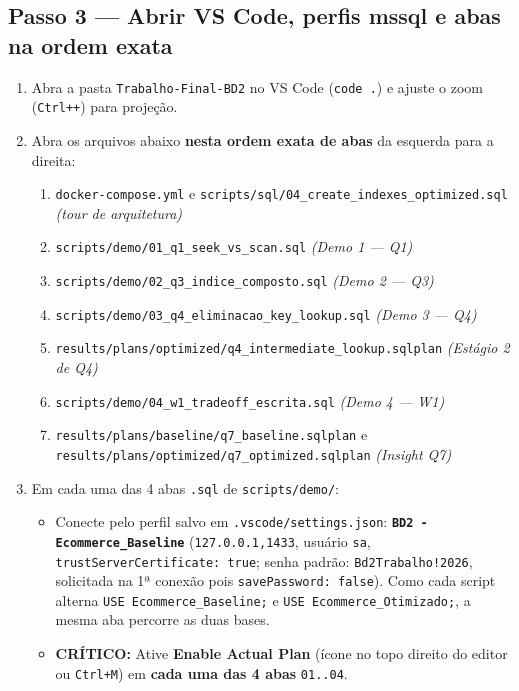 \documentclass[10pt,a4paper]{article}
\begin{document}
\subsection*{Passo 3 — Abrir VS Code, perfis mssql e abas na ordem exata}
\begin{enumerate}[leftmargin=16pt,itemsep=2pt,topsep=2pt]
  \item Abra a pasta \texttt{Trabalho-Final-BD2} no VS Code (\texttt{code .}) e ajuste o zoom (\texttt{Ctrl++}) para projeção.
  \item Abra os arquivos abaixo \textbf{nesta ordem exata de abas} da esquerda para a direita:
  \begin{enumerate}[leftmargin=14pt,itemsep=1pt,topsep=1pt]
    \item \texttt{docker-compose.yml} e \texttt{scripts/sql/04\_create\_indexes\_optimized.sql} \emph{(tour de arquitetura)}
    \item \texttt{scripts/demo/01\_q1\_seek\_vs\_scan.sql} \emph{(Demo 1 — Q1)}
    \item \texttt{scripts/demo/02\_q3\_indice\_composto.sql} \emph{(Demo 2 — Q3)}
    \item \texttt{scripts/demo/03\_q4\_eliminacao\_key\_lookup.sql} \emph{(Demo 3 — Q4)}
    \item \texttt{results/plans/optimized/q4\_intermediate\_lookup.sqlplan} \emph{(Estágio 2 de Q4)}
    \item \texttt{scripts/demo/04\_w1\_tradeoff\_escrita.sql} \emph{(Demo 4 — W1)}
    \item \texttt{results/plans/baseline/q7\_baseline.sqlplan} e \texttt{results/plans/optimized/q7\_optimized.sqlplan} \emph{(Insight Q7)}
  \end{enumerate}
  \item Em cada uma das 4 abas \texttt{.sql} de \texttt{scripts/demo/}:
  \begin{itemize}[leftmargin=14pt,itemsep=1pt,topsep=1pt]
    \item Conecte pelo perfil salvo em \texttt{.vscode/settings.json}: \textbf{\texttt{BD2 - Ecommerce\_Baseline}} (\texttt{127.0.0.1,1433}, usuário \texttt{sa}, \texttt{trustServerCertificate: true}; senha padrão: \texttt{Bd2Trabalho!2026}, solicitada na 1ª conexão pois \texttt{savePassword: false}). Como cada script alterna \texttt{USE Ecommerce\_Baseline;} e \texttt{USE Ecommerce\_Otimizado;}, a mesma aba percorre as duas bases.
    \item \textbf{CRÍTICO:} Ative \textbf{Enable Actual Plan} (ícone no topo direito do editor ou \texttt{Ctrl+M}) em \textbf{cada uma das 4 abas} \texttt{01..04}.
  \end{itemize}
\end{enumerate}
\end{document}
